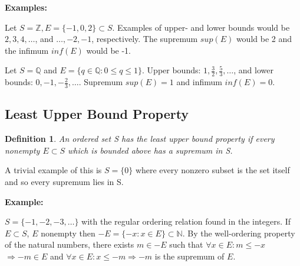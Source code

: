 \documentclass[12pt]{article}
\newtheorem{definition}{Definition}
\begin{document}
\noindent 
\textbf{Examples:}

\noindent
Let \(S = \mathbb Z, E = \{-1,0,2\} \subset S\). 
Examples of upper- and lower bounds would be \(2,3,4,\dots\), 
and \(\dots, -2,-1\), respectively.  
The supremum \(sup(E)\) would be 2 and the infimum \(inf(E)\) would be -1.

\noindent 
Let \(S = \mathbb Q\) and \(E = \{q \in \mathbb Q : 0 \leq q \leq 1\}\). 
Upper bounds: \(1, \frac{3}{2}, \frac{5}{3}, \dots\), and lower bounds: 
\(0, -1, -\frac{2}{3}, \dots\). Supremum \(sup(E) = 1\) and infimum \(inf(E) = 0\).

\subsection*{Least Upper Bound Property}
\begin{definition}
    An ordered set S has the least upper bound property if every nonempty 
    \(E \subset S\) which is bounded above has a supremum in S. 
\end{definition} 

\noindent 
A trivial example of this is \(S = \{0\}\) where every nonzero subset is the set itself 
and so every supremum lies in S.
 
\noindent 
\textbf{Example:} 

\noindent 
\(S = \{-1,-2,-3,\dots\}\) with the regular ordering relation found in the integers. 
If \(E \subset S\), \(E\) nonempty then \(-E = \{-x : x \in E\} \subset \mathbb N\). 
By the well-ordering property of the natural numbers, there exists \(m \in -E\) 
such that \(\forall x \in E : m \leq -x\) \(\Rightarrow -m \in E\) and 
\(\forall x \in E : x\leq -m \Rightarrow -m\) is the supremum of \(E\).
\end{document}

